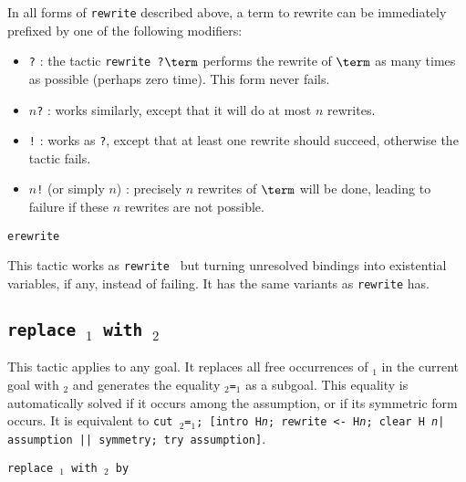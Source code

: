 \begin{coq_example*}
\begin{Variants}
\item In all forms of {\tt rewrite} described above, a term to rewrite
  can be immediately prefixed by one of the following modifiers:
  \begin{itemize}
  \item {\tt ?} : the tactic {\tt rewrite ?$\term$} performs the
    rewrite of $\term$  as many times as possible (perhaps zero time).
    This form never fails.
  \item {\tt $n$?} : works similarly, except that it will do at most
   $n$ rewrites.
  \item {\tt !} : works as {\tt ?}, except that at least one rewrite
    should succeed, otherwise the tactic fails.
  \item {\tt $n$!} (or simply {\tt $n$}) : precisely $n$ rewrites
    of $\term$ will be done, leading to failure if these $n$ rewrites are not possible.
  \end{itemize}

\item {\tt erewrite {\term}}

This tactic works as {\tt rewrite {\term}} but turning unresolved
bindings into existential variables, if any, instead of failing. It has
the same variants as {\tt rewrite} has.

\end{Variants}

\subsection{\tt replace \term$_1$ with \term$_2$}
\label{tactic:replace}

This tactic applies to any goal. It replaces all free occurrences of
{\term$_1$} in the current goal with {\term$_2$} and generates the
equality {\term$_2$}{\tt =}{\term$_1$} as a subgoal. This equality is
automatically solved if it occurs among the assumption, or if its
symmetric form occurs.  It is equivalent to {\tt cut
\term$_2$=\term$_1$; [intro H{\sl n}; rewrite <- H{\sl n}; clear H{\sl
n}| assumption || symmetry; try assumption]}.

\begin{ErrMsgs}
\item {}
\end{ErrMsgs}

\begin{Variants}

\item {\tt replace \term$_1$ with \term$_2$ by \tac}


\end{Variants}
\end{coq_example*}

